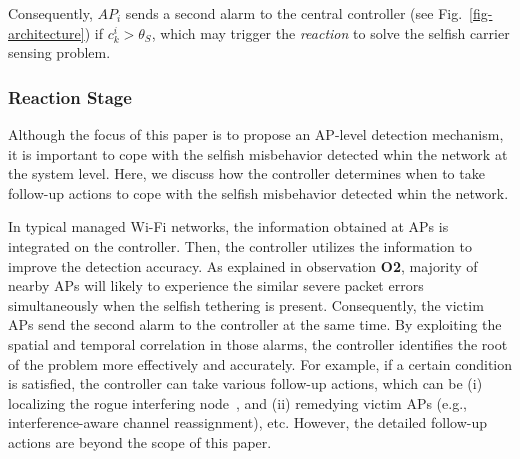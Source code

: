 Consequently, $AP_i$ sends a second alarm to the central controller
(see Fig.~\ref{fig-architecture}) if $c_k^i > \theta_{S}$,
which may trigger the \emph{reaction}
to solve the selfish carrier sensing problem.

\subsubsection{Reaction Stage}
%
Although the focus of this paper is to propose an AP-level detection
mechanism, it is important to cope with the selfish misbehavior detected
whin the network at the system level.
% 
Here, we discuss how the controller determines when to take 
follow-up actions to cope with the selfish misbehavior detected 
whin the network.

In typical managed Wi-Fi networks, the information obtained at APs
is integrated on the controller. Then, the controller utilizes
the information to improve the detection accuracy.
%
As explained in observation {\bf O2}, majority of nearby APs will likely 
to experience the similar severe packet errors simultaneously when
the selfish tethering is present. Consequently, the victim APs send
the second alarm to the controller at the same time.
By exploiting the spatial and temporal correlation in those alarms, 
the controller identifies the root of the problem more effectively and 
accurately. 
%
For example, if a certain condition is satisfied,
the controller can take various follow-up actions, which can
be (i) localizing the rogue interfering node~\cite{Joshi:Katti2013},
and (ii) remedying victim APs (e.g., interference-aware channel
reassignment), etc. However, the detailed follow-up actions are
beyond the scope of this paper.
